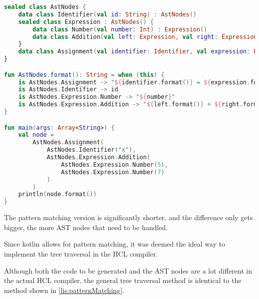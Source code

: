 \begin{lstlisting}[language=Kotlin,label=lis:patternMatching,caption=Tree traversal using pattern matching.]
sealed class AstNodes {
	data class Identifier(val id: String) : AstNodes()
	sealed class Expression : AstNodes() {
		data class Number(val number: Int) : Expression()
		data class Addition(val left: Expression, val right: Expression) : Expression()
	}
	data class Assignment(val identifier: Identifier, val expression: Expression) : AstNodes()
}

fun AstNodes.format(): String = when (this) {
	is AstNodes.Assignment -> "${identifier.format()} = ${expression.format()}"
	is AstNodes.Identifier -> id
	is AstNodes.Expression.Number -> "${number}"
	is AstNodes.Expression.Addition -> "${left.format()} + ${right.format()}"
}

fun main(args: Array<String>) {
	val node =
		AstNodes.Assignment(
			AstNodes.Identifier("x"),
			AstNodes.Expression.Addition(
				AstNodes.Expression.Number(5),
				AstNodes.Expression.Number(7)
			)
		)
	println(node.format())
}
\end{lstlisting}

The pattern matching version is significantly shorter, and the difference only gets bigger, the more AST nodes that need to be handled.

Since kotlin allows for pattern matching, it was deemed the ideal way to implement the tree traversal in the HCL compiler.

Although both the code to be generated and the AST nodes are a lot different in the actual HCL compiler, the general tree traversal method is identical to the method shown in \ref{lis:patternMatching}.

